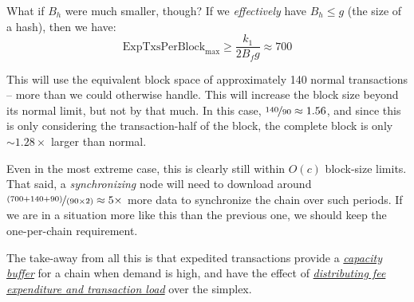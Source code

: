 
What if $B_h$ were much smaller, though?
If we \emph{effectively} have $B_h \le g$ (the size of a hash), then we have:
$$ \text{ExpTxsPerBlock}_\text{max} \ge \frac{k_1}{2 B_f g} \approx 700 $$

This will use the equivalent block space of approximately 140 normal transactions -- more than we could otherwise handle.
This will increase the block size beyond its normal limit, but not by that much.
In this case, $\nicefrac{140}{90} \approx 1.56$, and since this is only considering the transaction-half of the block, the complete block is only $\sim 1.28\times$ larger than normal.

Even in the most extreme case, this is clearly still within $O(c)$ block-size limits.
That said, a \emph{synchronizing} node will need to download around $\nicefrac{(700 + 140 + 90)}{(90 \times 2)} \approx 5\times$ more data to synchronize the chain over such periods.
If we are in a situation more like this than the previous one, we should keep the one-per-chain requirement.



The take-away from all this is that expedited transactions provide a \ul{\emph{capacity buffer}} for a chain when demand is high, and have the effect of \emph{\ul{distributing fee expenditure and transaction load}} over the simplex.

